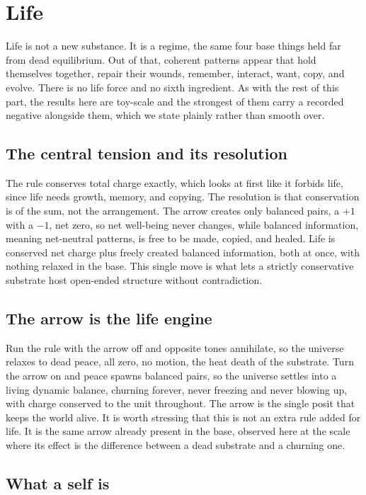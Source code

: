 \section{Life}

Life is not a new substance. It is a regime, the same four base things held far from dead equilibrium. Out of that, coherent patterns appear that hold themselves together, repair their wounds, remember, interact, want, copy, and evolve. There is no life force and no sixth ingredient. As with the rest of this part, the results here are toy-scale and the strongest of them carry a recorded negative alongside them, which we state plainly rather than smooth over.

\subsection{The central tension and its resolution}

The rule conserves total charge exactly, which looks at first like it forbids life, since life needs growth, memory, and copying. The resolution is that conservation is of the sum, not the arrangement. The arrow creates only balanced pairs, a $+1$ with a $-1$, net zero, so net well-being never changes, while balanced information, meaning net-neutral patterns, is free to be made, copied, and healed. Life is conserved net charge plus freely created balanced information, both at once, with nothing relaxed in the base. This single move is what lets a strictly conservative substrate host open-ended structure without contradiction.

\subsection{The arrow is the life engine}

Run the rule with the arrow off and opposite tones annihilate, so the universe relaxes to dead peace, all zero, no motion, the heat death of the substrate. Turn the arrow on and peace spawns balanced pairs, so the universe settles into a living dynamic balance, churning forever, never freezing and never blowing up, with charge conserved to the unit throughout. The arrow is the single posit that keeps the world alive. It is worth stressing that this is not an extra rule added for life. It is the same arrow already present in the base, observed here at the scale where its effect is the difference between a dead substrate and a churning one.

\subsection{What a self is}


